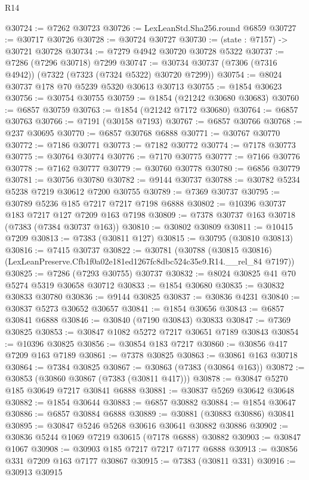 \begin{lexlean}{R14}
\begin{coremodule}
@30724 := @7262 @30723
@30726 := LexLeanStd.Sha256.round @6859
@30727 := @30717 @30726
@30728 := @30724 @30727
@30730 := (state : @7157) -> @30721 @30728
@30734 := @7279 @4942 @30720 @30728 @5322
@30737 := @7286 (@7296 @30718) @7299
@30747 := @30734 @30737 (@7306 (@7316 @4942)) (@7322 (@7323 (@7324 @5322) @30720 @7299))
@30754 := @8024 @30737 @178 @70 @5239 @5320 @30613 @30713
@30755 := @1854 @30623
@30756 := @30754 @30755
@30759 := @1854 (@21242 @30680 @30683)
@30760 := @6857 @30759
@30763 := @1854 (@21242 @7172 @30680)
@30764 := @6857 @30763
@30766 := @7191 (@30158 @7193)
@30767 := @6857 @30766
@30768 := @237 @30695
@30770 := @6857 @30768 @6888
@30771 := @30767 @30770
@30772 := @7186 @30771
@30773 := @7182 @30772
@30774 := @7178 @30773
@30775 := @30764 @30774
@30776 := @7170 @30775
@30777 := @7166 @30776
@30778 := @7162 @30777
@30779 := @30760 @30778
@30780 := @6856 @30779
@30781 := @30756 @30780
@30782 := @9144 @30737
@30788 := @30782 @5234 @5238 @7219 @30612 @7200 @30755
@30789 := @7369 @30737
@30795 := @30789 @5236 @185 @7217 @7217 @7198 @6888
@30802 := @10396 @30737 @183 @7217 @127 @7209 @163 @7198
@30809 := @7378 @30737 @163 @30718 (@7383 (@7384 @30737 @163))
@30810 := @30802 @30809
@30811 := @10415 @7209
@30813 := @7383 (@30811 @127)
@30815 := @30795 (@30810 @30813)
@30816 := @7415 @30737
@30822 := @30781
    (@30788 (@30815 @30816) (LexLeanPreserve.Cfb1f0a02e181ed1267fc8dbc524c35e9.R14.__rel_84 @7197))
@30825 := @7286 (@7293 @30755) @30737
@30832 := @8024 @30825 @41 @70 @5274 @5319 @30658 @30712
@30833 := @1854 @30680
@30835 := @30832 @30833 @30780
@30836 := @9144 @30825
@30837 := @30836 @4231
@30840 := @30837 @5273 @30652 @30657
@30841 := @1854 @30656
@30843 := @6857 @30841 @6888
@30846 := @30840 (@7190 @30843) @30833
@30847 := @7369 @30825
@30853 := @30847 @1082 @5272 @7217 @30651 @7189 @30843
@30854 := @10396 @30825
@30856 := @30854 @183 @7217
@30860 := @30856 @417 @7209 @163 @7189
@30861 := @7378 @30825
@30863 := @30861 @163 @30718
@30864 := @7384 @30825
@30867 := @30863 (@7383 (@30864 @163))
@30872 := @30853 (@30860 @30867 (@7383 (@30811 @417)))
@30878 := @30847 @5270 @185 @30649 @7217 @30841 @6888
@30881 := @30837 @5269 @30642 @30648
@30882 := @1854 @30644
@30883 := @6857 @30882
@30884 := @1854 @30647
@30886 := @6857 @30884 @6888
@30889 := @30881 (@30883 @30886) @30841
@30895 := @30847 @5246 @5268 @30616 @30641 @30882 @30886
@30902 := @30836 @5244 @1069 @7219 @30615 (@7178 @6888) @30882
@30903 := @30847 @1067
@30908 := @30903 @185 @7217 @7217 @7177 @6888
@30913 := @30856 @331 @7209 @163 @7177 @30867
@30915 := @7383 (@30811 @331)
@30916 := @30913 @30915

\end{coremodule}
\end{lexlean}
